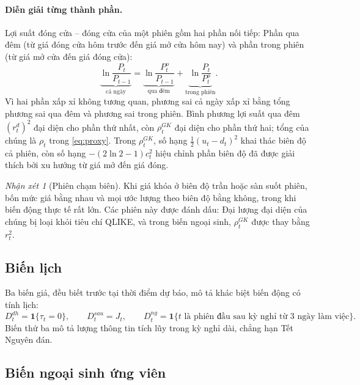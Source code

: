 \documentclass[12pt,a4paper]{article}
\theoremstyle{definition}
\theoremstyle{remark}
\newtheorem{nhanxet}{Nhận xét}[section]
\newcommand{\ind}{\mathbf{1}}
\begin{document}
\paragraph{Diễn giải từng thành phần.} Lợi suất đóng cửa -- đóng cửa của một phiên gồm hai phần nối tiếp: Phần qua đêm (từ giá đóng cửa hôm trước đến giá mở cửa hôm nay) và phần trong phiên (từ giá mở cửa đến giá đóng cửa):
\begin{equation*}
\underbrace{\ln\frac{P_t}{P_{t-1}}}_{\text{cả ngày}}=\underbrace{\ln\frac{P^{o}_t}{P_{t-1}}}_{\text{qua đêm}}+\underbrace{\ln\frac{P_t}{P^{o}_t}}_{\text{trong phiên}} .
\end{equation*}
Vì hai phần xấp xỉ không tương quan, phương sai cả ngày xấp xỉ bằng tổng phương sai qua đêm và phương sai trong phiên. Bình phương lợi suất qua đêm $(r^d_t)^2$ đại diện cho phần thứ nhất, còn $\rho^{GK}_t$ đại diện cho phần thứ hai; tổng của chúng là $\rho_t$ trong \eqref{eq:proxy}. Trong $\rho^{GK}_t$, số hạng $\tfrac12(u_t-d_t)^2$ khai thác biên độ cả phiên, còn số hạng $-(2\ln2-1)c^2_t$ hiệu chỉnh phần biên độ đã được giải thích bởi xu hướng từ giá mở đến giá đóng.

\begin{nhanxet}[Phiên chạm biên]
Khi giá khóa ở biên độ trần hoặc sàn suốt phiên, bốn mức giá bằng nhau và mọi ước lượng theo biên độ bằng không, trong khi biến động thực tế rất lớn. Các phiên này được đánh dấu: Đại lượng đại diện của chúng bị loại khỏi tiêu chí QLIKE, và trong biến ngoại sinh, $\rho^{GK}_t$ được thay bằng $r_t^2$.
\end{nhanxet}

\subsection{Biến lịch}

Ba biến giả, đều biết trước tại thời điểm dự báo, mô tả khác biệt biến động có tính lịch:
\begin{equation}
D^{dh}_t=\ind\{\tau_t=0\},\qquad D^{sau}_t=J_t,\qquad D^{ng}_t=\ind\{t \text{ là phiên đầu sau kỳ nghỉ từ } 3 \text{ ngày làm việc}\}.
\end{equation}
Biến thứ ba mô tả lượng thông tin tích lũy trong kỳ nghỉ dài, chẳng hạn Tết Nguyên đán.

\subsection{Biến ngoại sinh ứng viên}\label{sec:bienngoaisinh}
\end{document}
